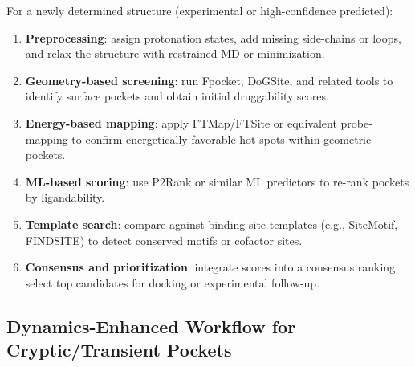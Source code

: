 \documentclass[12pt,a4paper]{article}
\begin{document}
For a newly determined structure (experimental or high-confidence predicted):
\begin{enumerate}
    \item \textbf{Preprocessing}: assign protonation states, add missing side-chains or loops, and relax the structure with restrained MD or minimization.
    \item \textbf{Geometry-based screening}: run Fpocket, DoGSite, and related tools to identify surface pockets and obtain initial druggability scores.\cite{CH5_LeGuilloux2009,CH5_Volkamer2012}
    \item \textbf{Energy-based mapping}: apply FTMap/FTSite or equivalent probe-mapping to confirm energetically favorable hot spots within geometric pockets.\cite{CH5_Ngan2012}
    \item \textbf{ML-based scoring}: use P2Rank or similar ML predictors to re-rank pockets by ligandability.\cite{CH5_Krivak2018}
    \item \textbf{Template search}: compare against binding-site templates (e.g., SiteMotif, FINDSITE) to detect conserved motifs or cofactor sites.\cite{CH5_Brylinski2008FINDSITE,CH5_SiteMotif2022}
    \item \textbf{Consensus and prioritization}: integrate scores into a consensus ranking; select top candidates for docking or experimental follow-up.
\end{enumerate}

\subsection{Dynamics-Enhanced Workflow for Cryptic/Transient Pockets}
\end{document}
